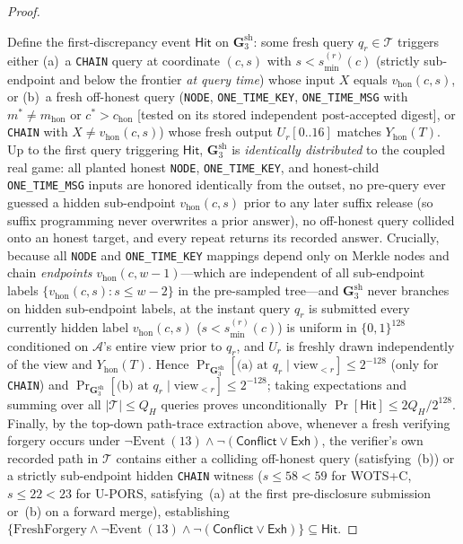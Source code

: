 \documentclass[11pt,a4paper]{article}
\theoremstyle{definition}
\theoremstyle{remark}
\newcommand{\WOTSC}{\textsf{WOTS+C}}
\newcommand{\UPORS}{\textsf{U-PORS}}
\newcommand{\bits}{\{0,1\}}
\begin{document}
\begin{proof}
\begin{itemize}[leftmargin=1.4em,itemsep=1pt]
\end{itemize}
Define the first-discrepancy event $\mathsf{Hit}$ on $\mathbf{G}_3^{\mathrm{sh}}$: some fresh query $q_r \in \mathcal{T}$ triggers either (a)~a \texttt{CHAIN} query at coordinate $(c, s)$ with $s < s_{\min}^{(r)}(c)$ (strictly sub-endpoint and below the frontier \emph{at query time}) whose input $X$ equals $v_{\mathrm{hon}}(c, s)$, or (b)~a fresh off-honest query (\texttt{NODE}, \texttt{ONE\_TIME\_KEY}, \texttt{ONE\_TIME\_MSG} with $m^* \neq m_{\mathrm{hon}}$ or $c^* > c_{\mathrm{hon}}$ [tested on its stored independent post-accepted digest], or \texttt{CHAIN} with $X \neq v_{\mathrm{hon}}(c, s)$) whose fresh output $U_r[0..16]$ matches $Y_{\mathrm{hon}}(T)$. Up to the first query triggering $\mathsf{Hit}$, $\mathbf{G}_3^{\mathrm{sh}}$ is \emph{identically distributed} to the coupled real game: all planted honest \texttt{NODE}, \texttt{ONE\_TIME\_KEY}, and honest-child \texttt{ONE\_TIME\_MSG} inputs are honored identically from the outset, no pre-query ever guessed a hidden sub-endpoint $v_{\mathrm{hon}}(c, s)$ prior to any later suffix release (so suffix programming never overwrites a prior answer), no off-honest query collided onto an honest target, and every repeat returns its recorded answer. Crucially, because all \texttt{NODE} and \texttt{ONE\_TIME\_KEY} mappings depend only on Merkle nodes and chain \emph{endpoints} $v_{\mathrm{hon}}(c, w{-}1)$---which are independent of all sub-endpoint labels $\{v_{\mathrm{hon}}(c, s) : s \le w{-}2\}$ in the pre-sampled tree---and $\mathbf{G}_3^{\mathrm{sh}}$ never branches on hidden sub-endpoint labels, at the instant query $q_r$ is submitted every currently hidden label $v_{\mathrm{hon}}(c, s)$ ($s < s_{\min}^{(r)}(c)$) is uniform in $\bits^{128}$ conditioned on $\mathcal{A}$'s entire view prior to $q_r$, and $U_r$ is freshly drawn independently of the view and $Y_{\mathrm{hon}}(T)$. Hence $\Pr_{\mathbf{G}_3^{\mathrm{sh}}}[\text{(a) at } q_r \mid \mathrm{view}_{< r}] \le 2^{-128}$ (only for \texttt{CHAIN}) and $\Pr_{\mathbf{G}_3^{\mathrm{sh}}}[\text{(b) at } q_r \mid \mathrm{view}_{< r}] \le 2^{-128}$; taking expectations and summing over all $|\mathcal{T}| \le Q_H$ queries proves unconditionally $\Pr[\mathsf{Hit}] \le 2 Q_H / 2^{128}$. Finally, by the top-down path-trace extraction above, whenever a fresh verifying forgery occurs under $\neg\mathrm{Event~(13)} \wedge \neg(\mathsf{Conflict} \vee \mathsf{Exh})$, the verifier's own recorded path in $\mathcal{T}$ contains either a colliding off-honest query (satisfying~(b)) or a strictly sub-endpoint hidden \texttt{CHAIN} witness ($s \le 58 < 59$ for \WOTSC{}, $s \le 22 < 23$ for \UPORS{}, satisfying~(a) at the first pre-disclosure submission or~(b) on a forward merge), establishing $\{\text{FreshForgery} \wedge \neg\mathrm{Event~(13)} \wedge \neg(\mathsf{Conflict} \vee \mathsf{Exh})\} \subseteq \mathsf{Hit}$.


\end{proof}
\end{document}
